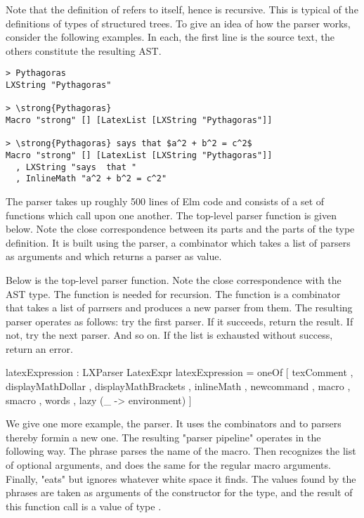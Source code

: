 Note that the definition of  refers to itself, hence is recursive.  This is typical of the definitions of types of structured trees.
To give an idea of how the parser works, consider the following  examples.  In each, the first line is the source text, the others constitute the resulting AST.

\begin{verbatim}
> Pythagoras
LXString "Pythagoras"

> \strong{Pythagoras}
Macro "strong" [] [LatexList [LXString "Pythagoras"]]

> \strong{Pythagoras} says that $a^2 + b^2 = c^2$
Macro "strong" [] [LatexList [LXString "Pythagoras"]]
  , LXString "says  that "
  , InlineMath "a^2 + b^2 = c^2"
\end{verbatim}


The parser takes up roughly 500 lines of Elm code and consists of a set of functions which call upon one another.  The top-level parser function is given below.  Note the close correspondence between its parts and the parts of the type definition.  It is built using the  parser, a combinator which takes a list of parsers as arguments and which returns a parser as value.

Below is the top-level parser function.  Note the close correspondence
with the AST type.  The  function is needed for recursion.  The  function is a combinator that takes a list of parrsers and produces a new parser from them.  The resulting parser operates as follows: try the first parser.  If it succeeds, return the result.  If not, try the next parser.  And so on.  If the list is exhausted without success, return an error.

\begin{listing}
latexExpression : LXParser LatexExpr
latexExpression =
    oneOf
        [ texComment
        , displayMathDollar
        , displayMathBrackets
        , inlineMath
        , newcommand
        , macro
        , smacro
        , words
        , lazy (\_ -> environment)
        ]
\end{listing}

We give one more example, the  parser.  It uses the combinators \code{(|=)} and  to  parsers thereby formin a new one.  The resulting "parser pipeline" operates  in the following way.   The phrase  parses the name of the macro.  Then  recognizes the list of optional arguments, and  does the same for the regular macro arguments.  Finally,  "eats" but ignores whatever white space it finds.  The values  found by the \code{(|=)} phrases are taken as arguments of  the constructor  for the  type, and the result of this function call is a value of type .

